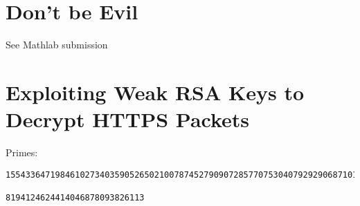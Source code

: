 \documentclass{article}
\begin{document}
\section{Don't be Evil}
See Mathlab submission
\section{Exploiting Weak RSA Keys to Decrypt HTTPS Packets}
Primes:\\
\begin{verbatim}
15543364719846102734035905265021007874527909072857707530407929290687101099950235380124854710034333308285660202980757696503925683873746491877865507719899027251207102262278680571817169261263452242836721127096300509656928177929591710741117876178047883330343700515792044255540432173197

8194124624414046878093826113
\end{verbatim}

\end{document}
